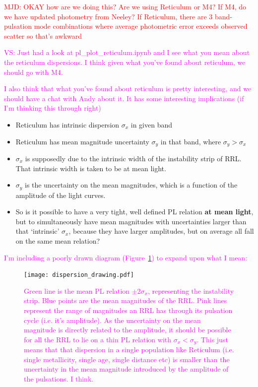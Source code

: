 \documentclass[a4paper,fleqn,usenatbib]{mnras}
\providecommand{\vscomment}[1]{{\textcolor{magenta}{{VS: #1}}}\xspace}
\providecommand{\mjdcomment}[1]{{\textcolor{red}{{MJD: #1}}}\xspace}
\begin{document}
\mjdcomment{OKAY how are we doing this? Are we using Reticulum or M4? If M4, do we have updated photometry from Neeley? If Reticulum, there are 3 band-pulsation mode combinations where average photometric error exceeds observed scatter so that's awkward}

\vscomment{Just had a look at pl\_plot\_reticulum.ipynb and I see what you mean about the reticulum dispersions. I think given what you've found about reticulum, we should go with M4.}

\textcolor{magenta}{
I also think that what you've found about reticulum is pretty interesting, and we should have a chat with Andy about it. It has some interesting implications (if I'm thinking this through right)}

{\color{magenta}\begin{itemize}
\item Reticulum has intrinsic dispersion $\sigma_x$ in given band
\item Reticulum has mean magnitude uncertainty $\sigma_y$ in that band, where $\sigma_y > \sigma_x$
\item $\sigma_x$ is supposedly due to the intrinsic width of the instability strip of RRL. That intrinsic width is taken to be at mean light.
\item $\sigma_y$ is the uncertainty on the mean magnitudes, which is a function of the amplitude of the light curves. 
\item So is it possible to have a very tight, well defined PL relation {\bf at mean light}, but to simultaneously have mean magnitudes with uncertainties larger than that `intrinsic' $\sigma_x$, because they have larger amplitudes, but on average all fall on the same mean relation?
\end{itemize}}
\textcolor{magenta}{
I'm including a poorly drawn diagram (Figure~\ref{fig:badly_drawn_pl}) to expand upon what I mean:
}


\begin{figure}
\begin{center}
\texttt{[image: dispersion\_drawing.pdf]}
\caption{\textcolor{magenta}{Green line is the mean PL relation $\pm 2\sigma_x$, representing the instability strip. Blue points are the mean magnitudes of the RRL. Pink lines represent the range of magnitudes an RRL has through its pulsation cycle (i.e. it's amplitude). As the uncertainty on the mean magnitude is directly related to the amplitude, it should be possible for all the RRL to lie on a thin PL relation with $\sigma_x < \sigma_y$. This just means that that dispersion in a single population like Reticulum (i.e. single metallicity, single age, single distance etc) is smaller than the uncertainty in the mean magnitude introduced by the amplitude of the pulsations. I think.}  }
\label{fig:badly_drawn_pl}
\end{center}
\end{figure}
\end{document}
